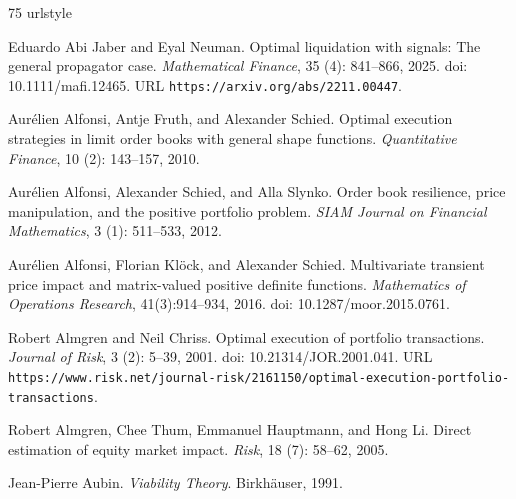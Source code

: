 \documentclass[11pt]{article}
\numberwithin{equation}{section}
\theoremstyle{definition}
\theoremstyle{remark}
\theoremstyle{definition}
\begin{document}
\clearpage
\setlength{\bibsep}{2pt plus 0.5pt minus 0.5pt}
\begin{thebibliography}{75}
\providecommand{\natexlab}[1]{#1}
\providecommand{\url}[1]{\texttt{#1}}
\expandafter\ifx\csname urlstyle\endcsname\relax
  \providecommand{\doi}[1]{doi: #1}\else
  \providecommand{\doi}{doi: \begingroup \urlstyle{rm}\Url}\fi

Eduardo {Abi Jaber} and Eyal Neuman.
\newblock Optimal liquidation with signals: The general propagator case.
\newblock \emph{Mathematical Finance}, 35 (4): 841--866,
  2025.
\newblock \doi{10.1111/mafi.12465}.
\newblock URL \url{https://arxiv.org/abs/2211.00447}.

Aur{\'e}lien Alfonsi, Antje Fruth, and Alexander Schied.
\newblock Optimal execution strategies in limit order books with general shape
  functions.
\newblock \emph{Quantitative Finance}, 10 (2): 143--157,
  2010.

Aur{\'e}lien Alfonsi, Alexander Schied, and Alla Slynko.
\newblock Order book resilience, price manipulation, and the positive portfolio
  problem.
\newblock \emph{SIAM Journal on Financial Mathematics}, 3
  (1): 511--533, 2012.

Aur{\'e}lien Alfonsi, Florian Kl{\"o}ck, and Alexander Schied.
\newblock Multivariate transient price impact and matrix-valued positive definite
functions.
\newblock \emph{Mathematics of Operations Research}, 41(3):914--934, 2016.
\newblock \doi{10.1287/moor.2015.0761}.

Robert Almgren and Neil Chriss.
\newblock Optimal execution of portfolio transactions.
\newblock \emph{Journal of Risk}, 3 (2): 5--39, 2001.
\newblock \doi{10.21314/JOR.2001.041}.
\newblock URL
  \url{https://www.risk.net/journal-risk/2161150/optimal-execution-portfolio-transactions}.

Robert Almgren, Chee Thum, Emmanuel Hauptmann, and Hong Li.
\newblock Direct estimation of equity market impact.
\newblock \emph{Risk}, 18 (7): 58--62, 2005.

Jean-Pierre Aubin.
\newblock \emph{Viability Theory}.
\newblock Birkh\"auser, 1991.


\end{thebibliography}
\end{document}
